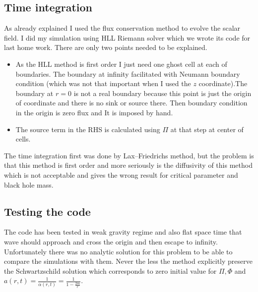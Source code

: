 \documentclass[a4paper,11pt]{article}
\begin{document}
 \subsection{Time integration}
 As already explained I used the flux conservation method to evolve the scalar field. I did my simulation using HLL Riemann solver which we wrote its code for last home work. There are only two points needed to be explained.
 \begin{itemize}
 	\item As the HLL method is first order I just need one ghost cell at each of boundaries. The boundary at infinity facilitated with Neumann boundary condition (which was not that important when I used the $z$ coordinate).The boundary at $r=0$ is not a real boundary because this point is just the origin of coordinate and there is no sink or source there. Then boundary condition in the origin is zero flux and It is imposed by hand.
 	\item The source term in the RHS is calculated using $\Pi$ at that step at center of cells.
 \end{itemize}
The time integration first was done by Lax–Friedrichs method, but the problem is that this method is first order and more seriously is the diffusivity of this method which is not acceptable and gives the wrong result for critical parameter and black hole mass.
\subsection{Testing the code}
The code has been tested in weak gravity regime and also flat space time that wave should approach and cross the origin and then escape to infinity. Unfortunately there was no analytic solution for this problem to be able to compare the simulations with them. Never the less the method explicitly preserve the Schwartzschild solution which corresponds to zero initial value for $\Pi,\Phi$ and $a(r,t)=
\frac{1}{\alpha(r,t)}=\frac{1}{1-\frac{2m}{r}}$.
\end{document}
